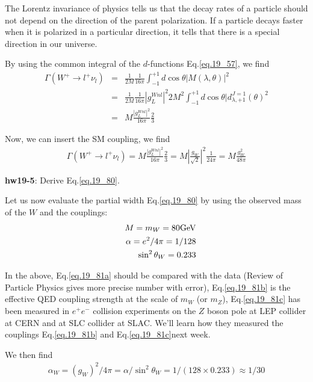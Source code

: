 \documentclass[12pt]{article}
\def\lmd{\lambda}
\begin{document}
The Lorentz invariance of physics tells us that the decay rates of
a particle should not depend on the direction of the parent
polarization.  If a particle decays faster when it is polarized in
a particular direction, it tells that there is a special direction
in our universe.

By using the common integral of the $d$-functions Eq.\ref{eq.19_57}, we find
\begin{eqnarray}
  \Gamma(W^+ \to l^+ \nu_l)
&=& \frac{1}{2M} \frac{1}{16\pi} \int_{-1}^{+1} d\cos\theta |M(\lambda,\theta)|^2\\
&=& \frac{1}{2M} \frac{1}{16\pi} |g_L^{Wnl}|^2 2M^2
    \int_{-1}^{+1} d\cos\theta |d^{J=1}_{\lmd,+1}(\theta)^2 \\
&=& M \frac{|g_L^{Wnl}|^2}{16\pi} \frac{2}{3} \label{eq.19_79}
\end{eqnarray}

Now, we can insert the SM coupling, we find
\begin{eqnarray}
  \Gamma(W^+ \to l^+ \nu_l)
= M \frac{|g_L^{Wnl}|^2}{16\pi} \frac{2}{3}
= M |\frac{g_W}{\sqrt 2}|^2 \frac{1}{24\pi}
= M \frac{g_W^2}{48\pi} \label{eq.19_80}
\end{eqnarray}

{\bf hw19-5}: Derive Eq.\ref{eq.19_80}.

Let us now evaluate the partial width Eq.\ref{eq.19_80} by using the observed mass of the $W$ and the couplings:
\begin{eqnarray}
  &&M = m_W = 80 {\rm GeV} \label{eq.19_81a}\\
  &&\alpha = e^2/4\pi = 1/128 \label{eq.19_81b}\\
  &&\sin^2\theta_W = 0.233 \label{eq.19_81c}
\end{eqnarray}

In the above, Eq.\ref{eq.19_81a} should be compared with the data (Review of
Particle Physics gives more precise number with error), Eq.\ref{eq.19_81b} is
the effective QED coupling strength at the scale of $m_W$ (or $m_Z$),
Eq.\ref{eq.19_81c} has been measured in $e^+e^-$ collision experiments on the $Z$ boson pole at LEP collider at CERN and at SLC collider at SLAC.  We'll learn how they measured the couplings Eq.\ref{eq.19_81b} and Eq.\ref{eq.19_81c}next week.

We then find
\begin{eqnarray}
  \alpha_W = (g_W)^2/4\pi = \alpha/\sin^2\theta_W
                            = 1/(128\times 0.233)
                            \approx 1/30 \label{eq.19_82}
\end{eqnarray}
\end{document}
